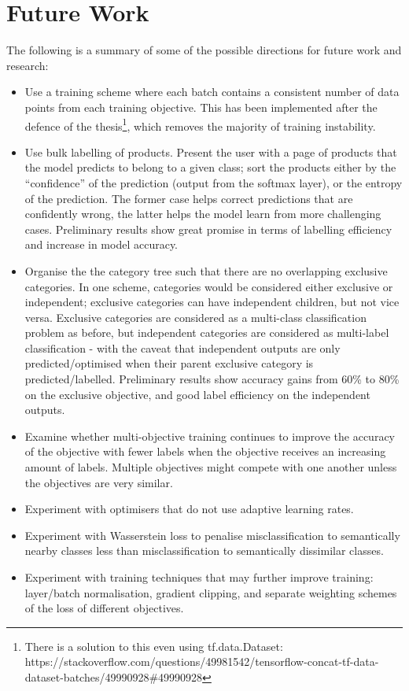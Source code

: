 \section{Future Work}

The following is a summary of some of the possible directions for future work and research:

\begin{itemize}
  \item
    Use a training scheme where each batch contains a consistent number of data points from each training objective.
    This has been implemented after the defence of the thesis\footnote{There is a solution to this even using tf.data.Dataset:\\ https://stackoverflow.com/questions/49981542/tensorflow-concat-tf-data-dataset-batches/49990928\#49990928}, which removes the majority of training instability.
  \item
    Use bulk labelling of products.
    Present the user with a page of products that the model predicts to belong to a given class; sort the products either by the ``confidence'' of the prediction (output from the softmax layer), or the entropy of the prediction.
    The former case helps correct predictions that are confidently wrong, the latter helps the model learn from more challenging cases.
    Preliminary results show great promise in terms of labelling efficiency and increase in model accuracy.
  \item
    Organise the the category tree such that there are no overlapping exclusive categories.
    In one scheme, categories would be considered either exclusive or independent; exclusive categories can have independent children, but not vice versa.
    Exclusive categories are considered as a multi-class classification problem as before, but independent categories are considered as multi-label classification - with the caveat that independent outputs are only predicted/optimised when their parent exclusive category is predicted/labelled.
    Preliminary results show accuracy gains from 60\% to 80\% on the exclusive objective, and good label efficiency on the independent outputs.
  \item
    Examine whether multi-objective training continues to improve the accuracy of the objective with fewer labels when the objective receives an increasing amount of labels.
    Multiple objectives might compete with one another unless the objectives are very similar.
  \item
    Experiment with optimisers that do not use adaptive learning rates.
  \item
    Experiment with Wasserstein loss to penalise misclassification to semantically nearby classes less than misclassification to semantically dissimilar classes.
  \item
    Experiment with training techniques that may further improve training: layer/batch normalisation, gradient clipping, and separate weighting schemes of the loss of different objectives.
\end{itemize}

